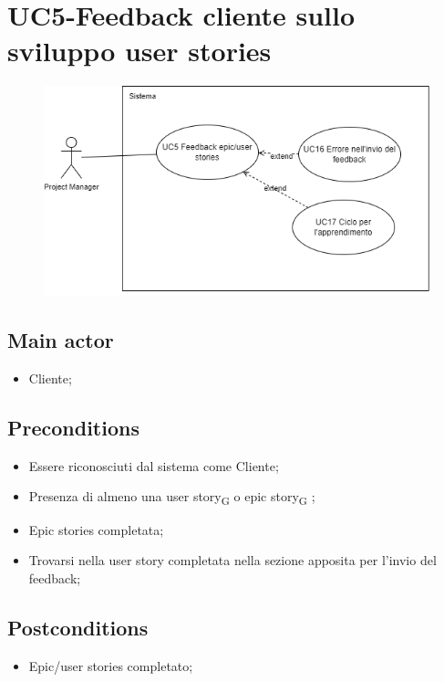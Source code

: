 \documentclass{article}
\begin{document}
\section{UC5-Feedback cliente sullo sviluppo user stories}
    \begin{figure}[h]
      \centering
      \includegraphics{./imgUML/UC5.png}
      \label{fig:immagine}
    \end{figure}
    
    \subsection*{Main actor}
    \begin{itemize}
        \item Cliente;
    \end{itemize}
    
    \subsection*{Preconditions}
    \begin{itemize}
        \item Essere riconosciuti dal sistema come Cliente;
        \item Presenza di almeno una user story\textsubscript{G}  o epic story\textsubscript{G} ;
        \item Epic stories completata;
        \item Trovarsi nella user story completata nella sezione apposita per l'invio del feedback;
    \end{itemize}
    
    \subsection*{Postconditions}
    \begin{itemize}
        \item Epic/user stories completato;
    \end{itemize}
    
\end{document}
